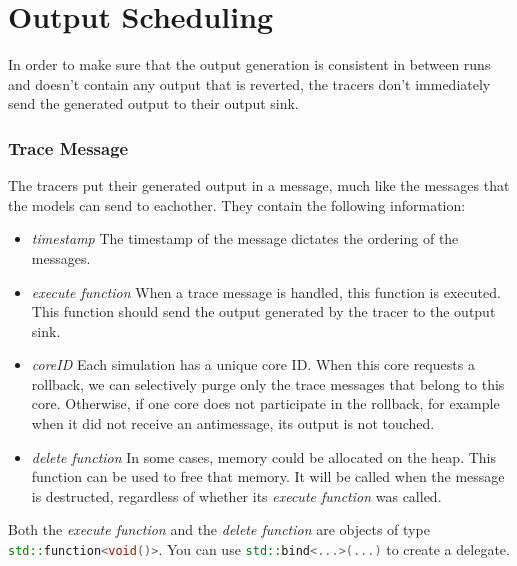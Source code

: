 \documentclass[12pt]{article}
\newcommand{\inlinecpp}[1]{\lstinline[language=c++]{#1}}
\begin{document}
\part*{Output Scheduling}
In order to make sure that the output generation is consistent in between runs and doesn't contain any output that is reverted, the tracers don't immediately send the generated output to their output sink.
\section{Trace Message}
The tracers put their generated output in a message, much like the messages that the models can send to eachother. They contain the following information:
\begin{itemize}
	\item \emph{timestamp} The timestamp of the message dictates the ordering of the messages.
	\item \emph{execute function} When a trace message is handled, this function is executed. This function should send the output generated by the tracer to the output sink.
	\item \emph{coreID} Each simulation has a unique core ID. When this core requests a rollback, we can selectively purge only the trace messages that belong to this core. Otherwise, if one core does not participate in the rollback, for example when it did not receive an antimessage, its output is not touched.
	\item \emph{delete function} In some cases, memory could be allocated on the heap. This function can be used to free that memory. It will be called when the message is destructed, regardless of whether its \emph{execute function} was called.
\end{itemize}
Both the \emph{execute function} and the \emph{delete function} are objects of type \inlinecpp{std::function<void()>}. You can use \inlinecpp{std::bind<...>(...)} to create a delegate.
\end{document}

